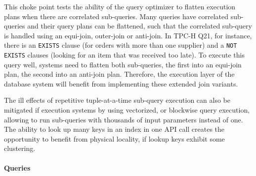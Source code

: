 
This choke point tests the ability of the query optimizer to flatten execution
plans when there are correlated sub-queries. Many queries have correlated
sub-queries and their query plans can be flattened, such that the correlated
sub-query is handled using an equi-join, outer-join or anti-join. In TPC-H Q21,
for instance, there is an \lstinline{EXISTS} clause (for orders with more than
one supplier) and a \lstinline{NOT EXISTS} clauses (looking for an item that was
received too late). To execute this query well, systems need to flatten both
sub-queries, the first into an equi-join plan, the second into an anti-join
plan. Therefore, the execution layer of the database system will benefit from
implementing these extended join variants.

The ill effects of repetitive tuple-at-a-time sub-query execution can also be
mitigated if execution systems by using vectorized, or blockwise query
execution, allowing to run sub-queries with thousands of input parameters
instead of one. The ability to look up many keys in an index in one API call
creates the opportunity to benefit from physical locality, if lookup keys
exhibit some clustering.


\paragraph{Queries}
{\raggedright
}
